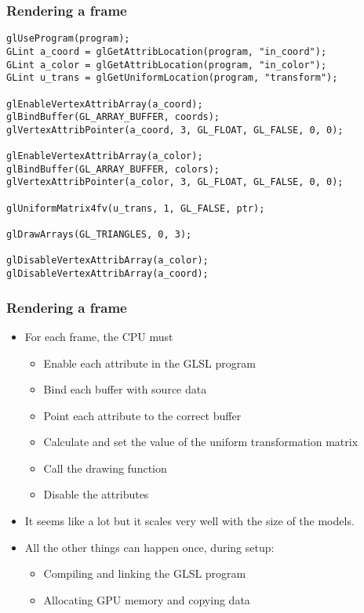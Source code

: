 \begin{frame}[fragile]
  \frametitle{Rendering a frame}
  \begin{lstlisting}[style=c, basicstyle=\ttfamily\scriptsize]
glUseProgram(program);
GLint a_coord = glGetAttribLocation(program, "in_coord");
GLint a_color = glGetAttribLocation(program, "in_color");
GLint u_trans = glGetUniformLocation(program, "transform");

glEnableVertexAttribArray(a_coord);
glBindBuffer(GL_ARRAY_BUFFER, coords);
glVertexAttribPointer(a_coord, 3, GL_FLOAT, GL_FALSE, 0, 0);

glEnableVertexAttribArray(a_color);
glBindBuffer(GL_ARRAY_BUFFER, colors);
glVertexAttribPointer(a_color, 3, GL_FLOAT, GL_FALSE, 0, 0);

glUniformMatrix4fv(u_trans, 1, GL_FALSE, ptr);

glDrawArrays(GL_TRIANGLES, 0, 3);

glDisableVertexAttribArray(a_color);
glDisableVertexAttribArray(a_coord);
  \end{lstlisting}
\end{frame}

\begin{frame}
  \frametitle{Rendering a frame}
  \begin{itemize}
  \item For each frame, the CPU must
    \begin{itemize}
    \item Enable each attribute in the GLSL program
    \item Bind each buffer with source data
    \item Point each attribute to the correct buffer
    \item Calculate and set the value of the uniform transformation matrix
    \item Call the drawing function
    \item Disable the attributes
    \end{itemize}
  \item It seems like a lot but it scales very well with the size of the models.
  \item All the other things can happen once, during setup:
    \begin{itemize}
    \item Compiling and linking the GLSL program
    \item Allocating GPU memory and copying data
    \end{itemize}
  \end{itemize}
\end{frame}

